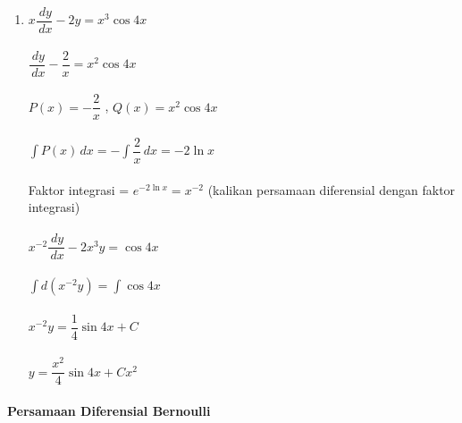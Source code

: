 \begin{enumerate}[1.]
	\item \begin{math} x\dfrac{\, dy}{\, dx} - 2y = x^{3} \cos 4x\end{math} \\ \\
	\begin{math} \dfrac{\, dy}{\, dx} - \dfrac{2}{x} = x^{2} \cos 4x \end{math} \\ \\
	\begin{math} P(x) = - \dfrac{2}{x} \end{math} , \begin{math} Q(x) = x^{2} \cos 4x \end{math} \\ \\
	\begin{math} \int P(x) \,dx = -\int \dfrac{2}{x} \, dx = -2 \ln x \end{math} \\ \\
	Faktor integrasi = \begin{math} e^{-2 \ln x} = x^{-2} \end{math} (kalikan persamaan diferensial dengan faktor integrasi) \\ \\
	\begin{math} x^{-2} \dfrac{\, dy}{\, dx} - 2x^{3}y = \cos 4x \end{math} \\ \\
	\begin{math} \int d(x^{-2}y) = \int \cos 4x \end{math} \\ \\
	\begin{math} x^{-2}y = \dfrac{1}{4} \sin 4x + C \end{math} \\ \\
	\begin{math} y = \dfrac{x^{2}}{4} \sin 4x + Cx^{2} \end{math}

\end{enumerate}

\paragraph{Persamaan Diferensial Bernoulli}
\label{par:PDBNL}

